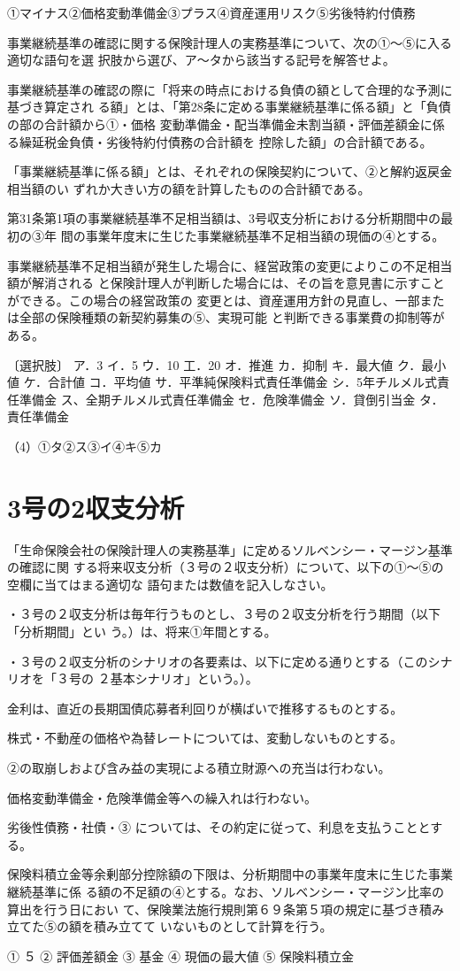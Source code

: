 \documentclass[report,gutter=10mm,fore-edge=10mm,uplatex,dvipdfmx]{jlreq}
\begin{document}
\answer{}
①マイナス②価格変動準備金③プラス④資産運用リスク⑤劣後特約付債務


事業継続基準の確認に関する保険計理人の実務基準について、次の①〜⑤に入る適切な語句を選
択肢から選び、ア〜タから該当する記号を解答せよ。

事業継続基準の確認の際に「将来の時点における負債の額として合理的な予測に基づき算定され
る額」とは、「第28条に定める事業継続基準に係る額」と「負債の部の合計額から①・価格
変動準備金・配当準備金未割当額・評価差額金に係る繰延税金負債・劣後特約付債務の合計額を
控除した額」の合計額である。

「事業継続基準に係る額」とは、それぞれの保険契約について、②と解約返戻金相当額のい
ずれか大きい方の額を計算したものの合計額である。

第31条第1項の事業継続基準不足相当額は、3号収支分析における分析期間中の最初の③年
間の事業年度末に生じた事業継続基準不足相当額の現価の④とする。

事業継続基準不足相当額が発生した場合に、経営政策の変更によりこの不足相当額が解消される
と保険計理人が判断した場合には、その旨を意見書に示すことができる。この場合の経営政策の
変更とは、資産運用方針の見直し、一部または全部の保険種類の新契約募集の⑤、実現可能
と判断できる事業費の抑制等がある。

〔選択肢〕
ア．3
イ．5
ウ．10
工．20
オ．推進
カ．抑制
キ．最大値
ク．最小値
ケ．合計値
コ．平均値
サ．平準純保険料式責任準備金
シ．5年チルメル式責任準備金
ス、全期チルメル式責任準備金
セ．危険準備金
ソ．貸倒引当金
タ．責任準備金

\answer{}
（4）①タ②ス③イ④キ⑤カ

\section{3号の2収支分析}
「生命保険会社の保険計理人の実務基準」に定めるソルベンシー・マージン基準の確認に関
する将来収支分析（３号の２収支分析）について、以下の①～⑤の空欄に当てはまる適切な
語句または数値を記入しなさい。

・３号の２収支分析は毎年行うものとし、３号の２収支分析を行う期間（以下「分析期間」とい
う。）は、将来①年間とする。

・３号の２収支分析のシナリオの各要素は、以下に定める通りとする（このシナリオを「３号の
２基本シナリオ」という。）。

 金利は、直近の長期国債応募者利回りが横ばいで推移するものとする。

 株式・不動産の価格や為替レートについては、変動しないものとする。

②の取崩しおよび含み益の実現による積立財源への充当は行わない。

 価格変動準備金・危険準備金等への繰入れは行わない。

 劣後性債務・社債・③
については、その約定に従って、利息を支払うこととする。

保険料積立金等余剰部分控除額の下限は、分析期間中の事業年度末に生じた事業継続基準に係
る額の不足額の④とする。なお、ソルベンシー・マージン比率の算出を行う日におい
て、保険業法施行規則第６９条第５項の規定に基づき積み立てた⑤の額を積み立てて
いないものとして計算を行う。

\answer{}
① ５ ② 評価差額金 
③ 基金 
④ 現価の最大値 ⑤ 保険料積立金 
\end{document}
